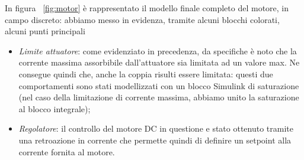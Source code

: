 In figura ~\ref{fig:motor} è rappresentato il modello finale completo del motore, in campo discreto: abbiamo messo in evidenza, tramite alcuni blocchi colorati, alcuni punti principali
\begin{itemize}
	\item \textit{Limite attuatore}: come evidenziato in precedenza, da specifiche è noto che la corrente massima assorbibile dall'attuatore sia limitata ad un valore max. Ne consegue quindi che, anche la coppia risulti essere limitata: questi due comportamenti sono stati modellizzati con un blocco Simulink di saturazione (nel caso della limitazione di corrente massima, abbiamo unito la saturazione al blocco integrale);
	\item \textit{Regolatore}: il controllo del motore DC in questione e stato ottenuto tramite una retroazione in corrente che permette quindi di definire un setpoint alla corrente fornita al motore.
	

\end{itemize}
